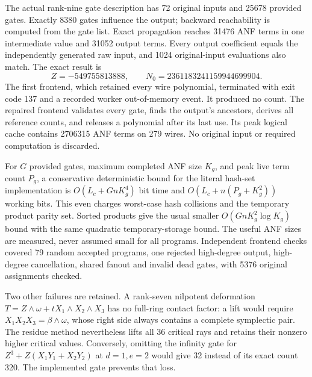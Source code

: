 The actual rank-nine gate description has 72 original inputs and 25678
provided gates. Exactly 8380 gates influence the output; backward
reachability is computed from the gate list. Exact propagation reaches
31476 ANF terms in one intermediate value and 31052 output terms.
Every output coefficient equals the independently generated raw input,
and 1024 original-input evaluations also match. The exact result is
\[
 Z=-549755813888,\qquad N_0=2361183241159944699904.
\]
The first frontend, which retained every wire polynomial, terminated
with exit code 137 and a recorded worker out-of-memory event. It produced
no count. The repaired frontend validates every gate, finds the output's
ancestors, derives all reference counts, and releases a polynomial after
its last use. Its peak logical cache contains 2706315 ANF terms on 279
wires. No original input or required computation is discarded.

For $G$ provided gates, maximum completed ANF size $K_g$, and peak live
term count $P_g$, a conservative deterministic bound for the literal
hash-set implementation is $O(L_c+GnK_g^4)$ bit time and
$O(L_c+n(P_g+K_g^2))$ working bits. This even charges worst-case hash
collisions and the temporary product parity set. Sorted products give
the usual smaller $O(GnK_g^2\log K_g)$ bound with the same quadratic
temporary-storage bound. The useful ANF sizes are measured, never assumed
small for all programs. Independent frontend checks covered 79 random
accepted programs, one rejected high-degree output, high-degree
cancellation, shared fanout and invalid dead gates, with 5376 original
assignments checked.

Two other failures are retained. A rank-seven nilpotent deformation
$T=Z\wedge\omega+tX_1\wedge X_2\wedge X_3$ has no full-ring contact
factor: a lift would require $X_1X_2X_3=\beta\wedge\omega$, whose
right side always contains a complete symplectic pair. The residue
method nevertheless lifts all 36 critical rays and retains their
nonzero higher critical values. Conversely, omitting the infinity
gate for $Z^3+Z(X_1Y_1+X_2Y_2)$ at $d=1,e=2$ would give 32 instead
of its exact count 320. The implemented gate prevents that loss.
